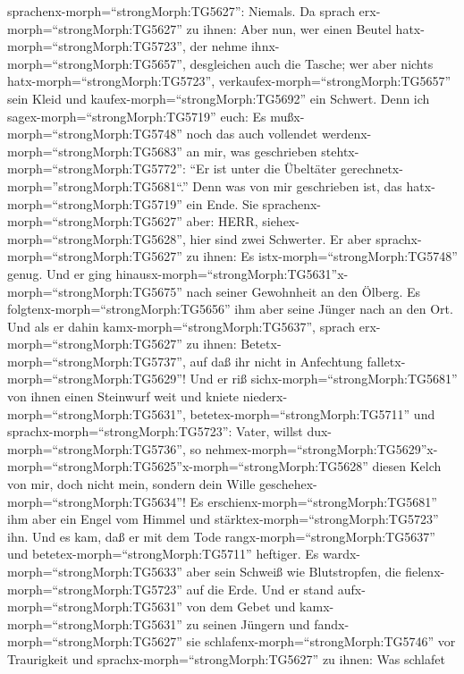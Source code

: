 sprachenx-morph=``strongMorph:TG5627'': Niemals.  Da sprach
erx-morph=``strongMorph:TG5627'' zu ihnen: Aber nun, wer einen Beutel
hatx-morph=``strongMorph:TG5723'', der nehme
ihnx-morph=``strongMorph:TG5657'', desgleichen auch die Tasche; wer aber
nichts hatx-morph=``strongMorph:TG5723'',
verkaufex-morph=``strongMorph:TG5657'' sein Kleid und
kaufex-morph=``strongMorph:TG5692'' ein Schwert.  Denn ich
sagex-morph=``strongMorph:TG5719'' euch: Es
mußx-morph=``strongMorph:TG5748'' noch das auch vollendet
werdenx-morph=``strongMorph:TG5683'' an mir, was geschrieben
stehtx-morph=``strongMorph:TG5772'': ``Er ist unter die Übeltäter
gerechnetx-morph=''strongMorph:TG5681``.'' Denn was von mir geschrieben
ist, das hatx-morph=``strongMorph:TG5719'' ein Ende.  Sie
sprachenx-morph=``strongMorph:TG5627'' aber: HERR,
siehex-morph=``strongMorph:TG5628'', hier sind zwei Schwerter. Er aber
sprachx-morph=``strongMorph:TG5627'' zu ihnen: Es
istx-morph=``strongMorph:TG5748'' genug.  Und er ging
hinausx-morph=``strongMorph:TG5631''x-morph=``strongMorph:TG5675'' nach
seiner Gewohnheit an den Ölberg. Es
folgtenx-morph=``strongMorph:TG5656'' ihm aber seine Jünger nach an den
Ort.  Und als er dahin kamx-morph=``strongMorph:TG5637'',
sprach erx-morph=``strongMorph:TG5627'' zu ihnen:
Betetx-morph=``strongMorph:TG5737'', auf daß ihr nicht in Anfechtung
falletx-morph=``strongMorph:TG5629''!  Und er riß
sichx-morph=``strongMorph:TG5681'' von ihnen einen Steinwurf weit und
kniete niederx-morph=``strongMorph:TG5631'',
betetex-morph=``strongMorph:TG5711''  und
sprachx-morph=``strongMorph:TG5723'': Vater, willst
dux-morph=``strongMorph:TG5736'', so
nehmex-morph=``strongMorph:TG5629''\textbar x-morph=``strongMorph:TG5625''x-morph=``strongMorph:TG5628''
diesen Kelch von mir, doch nicht mein, sondern dein Wille
geschehex-morph=``strongMorph:TG5634''!  Es
erschienx-morph=``strongMorph:TG5681'' ihm aber ein Engel vom Himmel und
stärktex-morph=``strongMorph:TG5723'' ihn.  Und es kam, daß
er mit dem Tode rangx-morph=``strongMorph:TG5637'' und
betetex-morph=``strongMorph:TG5711'' heftiger. Es
wardx-morph=``strongMorph:TG5633'' aber sein Schweiß wie Blutstropfen,
die fielenx-morph=``strongMorph:TG5723'' auf die Erde.  Und
er stand aufx-morph=``strongMorph:TG5631'' von dem Gebet und
kamx-morph=``strongMorph:TG5631'' zu seinen Jüngern und
fandx-morph=``strongMorph:TG5627'' sie
schlafenx-morph=``strongMorph:TG5746'' vor Traurigkeit  und
sprachx-morph=``strongMorph:TG5627'' zu ihnen: Was schlafet

